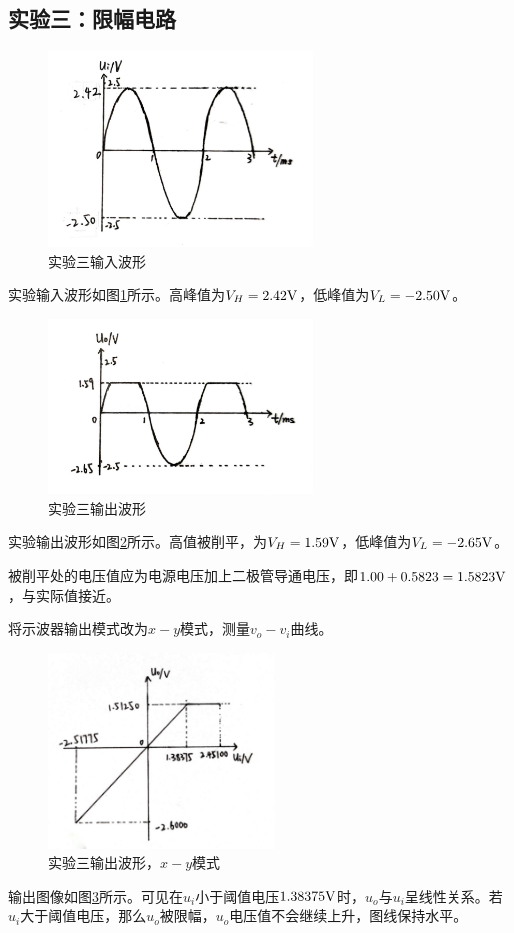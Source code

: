 \documentclass[a4paper,11pt,UTF8]{ctexart}
\begin{document}
\subsection{实验三：限幅电路}
\begin{figure}[H]
 \centering
 \includegraphics[width=7cm]{Exp3i}
 \caption{实验三输入波形}
 \label{fig:Exp3i}
\end{figure}
实验输入波形如图\ref{fig:Exp3i}所示。高峰值为$V_H=2.42\mathrm{V}$，低峰值为$V_L=-2.50\mathrm{V}$。
\begin{figure}[H]
 \centering
 \includegraphics[width=7cm]{Exp3o}
 \caption{实验三输出波形}
 \label{fig:Exp3o}
\end{figure}
实验输出波形如图\ref{fig:Exp3o}所示。高值被削平，为$V_H=1.59\mathrm{V}$，低峰值为$V_L=-2.65\mathrm{V}$。
\par 被削平处的电压值应为电源电压加上二极管导通电压，即$1.00+0.5823=1.5823\mathrm{V}$，与实际值接近。
\par 将示波器输出模式改为$x - y$模式，测量$v_o - v_i$曲线。
\begin{figure}[H]
 \centering
 \includegraphics[width=6cm]{Exp3oxy}
 \caption{实验三输出波形，$x - y$模式}
 \label{fig:Exp3oxy}
\end{figure}
输出图像如图\ref{fig:Exp3oxy}所示。可见在$u_i$小于阈值电压$1.38375\mathrm{V}$时，$u_o$与$u_i$呈线性关系。若$u_i$大于阈值电压，那么$u_o$被限幅，$u_o$电压值不会继续上升，图线保持水平。
\end{document}
